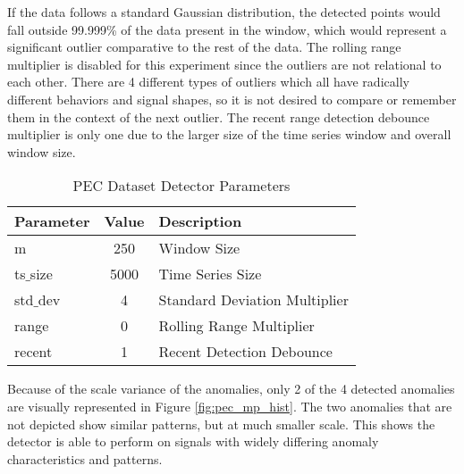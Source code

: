If the data follows a standard Gaussian distribution, the detected points would fall outside 99.999\% of the data present in the window, which would represent a significant outlier comparative to the rest of the data. The rolling range multiplier is disabled for this experiment since the outliers are not relational to each other. There are 4 different types of outliers which all have radically different behaviors and signal shapes, so it is not desired to compare or remember them in the context of the next outlier. The recent range detection debounce multiplier is only one due to the larger size of the time series window and overall window size.

\begin{table}[H]
\caption{PEC Dataset Detector Parameters}
\begin{tabular}{|l|c|l|}
    \hline
	\textbf{Parameter} & \textbf{Value} & \textbf{Description} \\ \hline
	m & 250 & Window Size \\ \hline
	ts$\_$size & 5000 & Time Series Size \\ \hline
	std$\_$dev & 4 & Standard Deviation Multiplier \\ \hline
	range & 0 & Rolling Range Multiplier\\ \hline
	recent & 1 & Recent Detection Debounce\\ \hline
\end{tabular}
\label{tab:pec_sim_params}
\end{table}

Because of the scale variance of the anomalies, only 2 of the 4 detected anomalies are visually represented in Figure \ref{fig:pec_mp_hist}. The two anomalies that are not depicted show similar patterns, but at much smaller scale. This shows the detector is able to perform on signals with widely differing anomaly characteristics and patterns.

